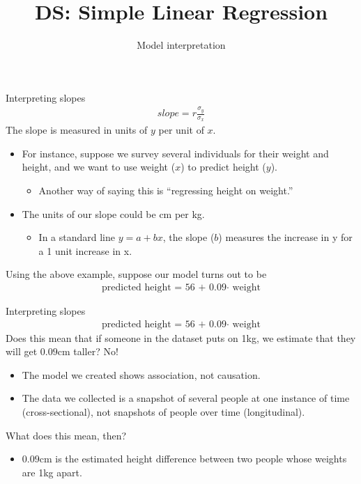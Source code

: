 \documentclass[aspectratio=169]{../latex_main/tntbeamer}  %
\title[Regression]{DS: Simple Linear Regression}
\subtitle{Model interpretation}
\begin{document}
	
	\maketitle
	\begin{frame}{Interpreting slopes}
	    \begin{align*}
	        slope= r\frac{\sigma_y}{\sigma_x}
	    \end{align*}
	    The slope is measured in units of $y$ per unit of $x$.
	    \begin{itemize}
	        \item For instance, suppose we survey several individuals for their weight and height, and we want to use weight ($x$) to predict height ($y$). 
	        \begin{itemize}
	            \item Another way of saying this is “regressing height on weight.”
	        \end{itemize}
	        \item The units of our slope could be cm per kg.
	        \begin{itemize}
	            \item In a standard line $y = a + bx$, the slope ($b$) measures the increase in y for a 1 unit increase in x.
	        \end{itemize}
	    \end{itemize}
	    Using the above example, suppose our model turns out to be 
	    \begin{align*}
	           \text{predicted height = 56 + 0.09$\cdot$ weight}
	    \end{align*}
	\end{frame}
	
	
	\begin{frame}{Interpreting slopes}
	    \begin{align*}
	           \text{predicted height = 56 + 0.09$\cdot$ weight}
	    \end{align*}
	    Does this mean that if someone in the dataset puts on 1kg, we estimate that they will get $0.09$cm taller? No!
	    \begin{itemize}
	        \item The model we created shows association, not causation.
	        \item The data we collected is a snapshot of several people at one instance of time (cross-sectional), not snapshots of people over time (longitudinal).
	     \end{itemize}
	    What does this mean, then?

	    \begin{itemize}
	        \item $0.09$cm is the estimated height difference between two people whose weights are 1kg apart. 
	    \end{itemize}
	\end{frame}
	
\end{document}
